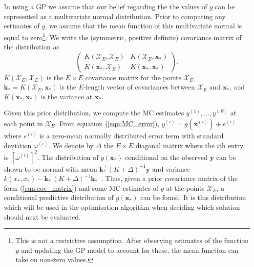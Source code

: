 \documentclass{article} %
\begin{document}
In using a GP we assume that our belief regarding the the values of $g$ can be represented as a multivariate normal distribution. Prior to computing any estimates of $g$, we assume that the mean function of this multivariate normal is equal to zero\footnote{This is not a restrictive assumption. After observing estimates of the function $g$ and updating the GP model to account for these, the mean function can take on non-zero values.}.
We write the (symmetric, positive definite) covariance matrix of the distribution as
\begin{equation}\label{eqn:cov_matrix}
\begin{pmatrix}
K(\mathcal{X}_{E}, \mathcal{X}_{E}) & K(\mathcal{X}_{E}, \mathbf{x}_{*}) \\
K(\mathbf{x}_{*}, \mathcal{X}_{E}) & K(\mathbf{x}_{*}, \mathbf{x}_{*})
\end{pmatrix}.
\end{equation}
$K(\mathcal{X}_{E}, \mathcal{X}_{E})$ is the $E \times E$ covariance matrix for the points $\mathcal{X}_{E}$, $\mathbf{k}_{*} = K(\mathcal{X}_{E}, \mathbf{x}_{*})$ is the $E$-length vector of covariances between $\mathcal{X}_{E}$ and $\mathbf{x}_{*}$, and $K(\mathbf{x}_{*}, \mathbf{x}_{*})$ is the variance at $\mathbf{x}_{*}$.

Given this prior distribution, we compute the MC estimates $y^{(1)} , \ldots , y^{(E)}$ at each point in $\mathcal{X}_{E}$. From equation (\ref{eqn:MC_error}), $y^{(i)} = g(\textbf{x}^{(i)}) + e^{(i)}$ where $e^{(i)}$ is a zero-mean normally distributed error term with standard deviation $\omega^{(i)}$. We denote by $\Delta$ the $E \times E$ diagonal matrix where the $i$th entry is $[\omega^{(i)}]^{2}$. The distribution of $g(\mathbf{x}_{*})$ conditional on the observed $\mathbf{y}$ can be shown to be normal with mean $\mathbf{k}_{*}^\top(K + \Delta)^{-1}\mathbf{y}$ and variance $k(x_{*}, x_{*})-\mathbf{k}_{*}^\top(K + \Delta)^{-1}\mathbf{k}_{*}$~\cite{Rasmussen2006}. Thus, given a prior covariance matrix of the form (\ref{eqn:cov_matrix}) and some MC estimates of $g$ at the points $\mathcal{X}_{E}$, a conditional predictive distribution of $g(\mathbf{x}_{*})$ can be found. It is this distribution which will be used in the optimisation algorithm when deciding which solution should next be evaluated.
\end{document}
